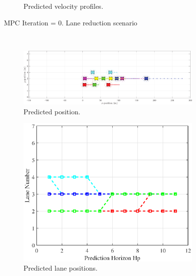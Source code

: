 \begin{figure}[H]
\begin{subfigure}[b]{0.45\textwidth}
    \caption{Predicted velocity profiles.}
    \label{fig:third}
\end{subfigure}
\caption{MPC Iteration = 0. Lane reduction scenario}
\label{fig:figures}
\end{figure}
\\
\begin{figure}[H]
\centering
\begin{subfigure}[t]{\textwidth}
    \includegraphics[width=\textwidth]{Kap6/red_lane/red_lane_traj10.eps}
    \caption{Predicted position.}
    \label{fig:first_mpc10_redsce}
\end{subfigure}
\vspace{1cm}
\begin{subfigure}[b]{0.45\textwidth}
    \includegraphics[width=\textwidth]{Kap6/red_lane/red_lane_lane10.eps}
    \caption{Predicted lane positions.}
    \label{fig:second}
\end{subfigure}
\hfill
\begin{subfigure}[b]{0.45\textwidth}

\end{subfigure}
\end{figure}
